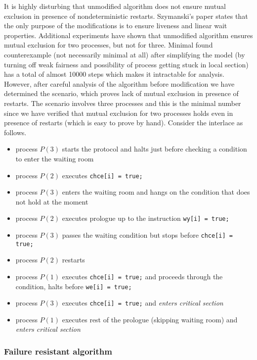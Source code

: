 It is highly disturbing that unmodified algorithm does not ensure mutual exclusion in presence of nondeterministic restarts.
Szymanski's paper \cite{Original} states that the only purpose of the modifications is to ensure liveness and linear wait properties.
Additional experiments have shown that unmodified algorithm ensures mutual exclusion for two processes, but not for three.
Minimal found counterexample (not necessarily minimal at all) after simplifying the model (by turning off weak fairness and possibility of process getting stuck in local section) has a total of almost 10000 steps which makes it intractable for analysis.
However, after careful analysis of the algorithm before modification we have determined the scenario, which proves lack of mutual exclusion in presence of restarts.
The scenario involves three processes and this is the minimal number since we have verified that mutual exclusion for two processes holds even in presence of restarts (which is easy to prove by hand).
Consider the interlace as follows.
\begin{itemize}
    \item process $P(3)$ starts the protocol and halts just before checking a condition to enter the waiting room
    \item process $P(2)$ executes \verb+chce[i] = true;+
    \item process $P(3)$ enters the waiting room and hangs on the condition that does not hold at the moment
    \item process $P(2)$ executes prologue up to the instruction \verb+wy[i] = true;+
    \item process $P(3)$ passes the waiting condition but stops before \verb+chce[i] = true;+
    \item process $P(2)$ restarts
    \item process $P(1)$ executes \verb+chce[i] = true;+ and proceeds through the condition, halts before \verb+we[i] = true;+
    \item process $P(3)$ executes \verb+chce[i] = true;+ and \emph{enters critical section}
    \item process $P(1)$ executes rest of the prologue (skipping waiting room) and \emph{enters critical section}
\end{itemize}

\subsubsection*{Failure resistant algorithm}

